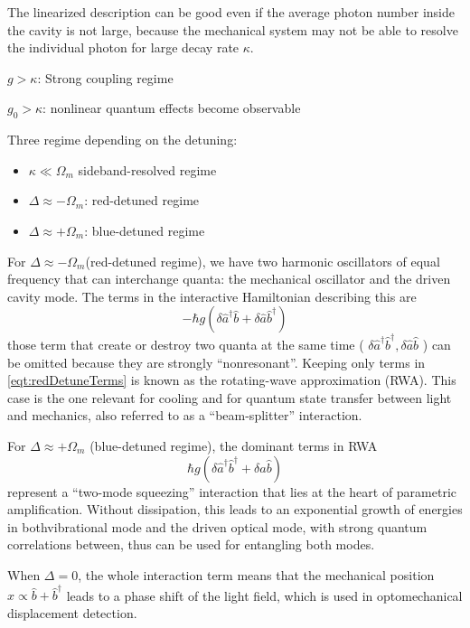 \documentclass[8pt,a4paper,twocolumn]{article} %
\numberwithin{equation}{section} %
\begin{document}
			The linearized description can be good even if the average photon number inside the cavity is not large, because the mechanical system may not be able to resolve the individual photon for large decay rate $\kappa$.

			$ g>\kappa $: Strong coupling regime

			$g_0>\kappa$: nonlinear quantum effects become observable

			Three regime depending on the detuning:
			\begin{itemize}
				\item $\kappa\ll \Omega_m $ sideband-resolved regime
				\item $ \Delta\approx -\Omega_m $: red-detuned regime
				\item $ \Delta\approx +\Omega_m $: blue-detuned regime
			\end{itemize}

			For $ \Delta\approx -\Omega_m $(red-detuned regime), we have two harmonic oscillators of equal frequency that can interchange quanta: the mechanical oscillator and the driven cavity mode. The terms in the interactive Hamiltonian describing this are
			\begin{equation}
			\label{eqt:redDetuneTerms}
				-\hbar g (\delta \hat a^{\dagger}\hat b+\delta\hat a \hat b^{\dagger} )
			\end{equation}
			those term that create or destroy two quanta at the same time ( $ \delta\hat a^{\dagger} \hat b^{\dagger}, \delta \hat a\hat b $ ) can be omitted because they are strongly ``nonresonant''. Keeping only terms in \ref{eqt:redDetuneTerms} is known as the rotating-wave approximation (RWA). This case is the one relevant for cooling and for quantum state transfer between light and mechanics, also referred to as a ``beam-splitter'' interaction.
			
			For $ \Delta\approx +\Omega_m $ (blue-detuned regime), the dominant terms in RWA
			\begin{equation}
				\hbar g( \delta\hat a^{\dagger} \hat b^{\dagger} + \delta \hat a\hat b )
			\end{equation}
			represent a ``two-mode squeezing'' interaction that lies at the heart of parametric amplification. Without dissipation, this leads to an exponential growth of energies in bothvibrational mode and the driven optical mode, with strong quantum correlations between, thus can be used for entangling both modes.

			When $ \Delta=0 $, the whole interaction term means that the mechanical position $ \hat x \propto \hat b+\hat b^ \dagger $ leads to a phase shift of the light field, which is used in optomechanical displacement detection.
\end{document}
